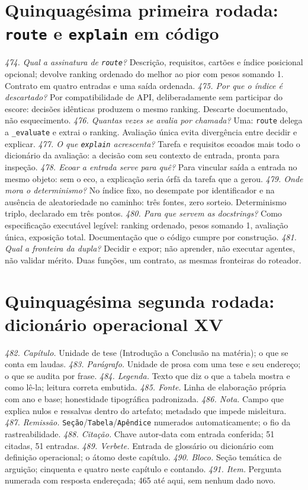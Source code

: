 \section{Quinquagésima primeira rodada: \texttt{route} e \texttt{explain} em código}
\textit{474. Qual a assinatura de \texttt{route}?} Descrição, requisitos, cartões e índice posicional opcional; devolve ranking ordenado do melhor ao pior com pesos somando 1. Contrato em quatro entradas e uma saída ordenada.
\textit{475. Por que o índice é descartado?} Por compatibilidade de API, deliberadamente sem participar do escore: decisões idênticas produzem o mesmo ranking. Descarte documentado, não esquecimento.
\textit{476. Quantas vezes se avalia por chamada?} Uma: \texttt{route} delega a \texttt{\_evaluate} e extrai o ranking. Avaliação única evita divergência entre decidir e explicar.
\textit{477. O que \texttt{explain} acrescenta?} Tarefa e requisitos ecoados mais todo o dicionário da avaliação: a decisão com seu contexto de entrada, pronta para inspeção.
\textit{478. Ecoar a entrada serve para quê?} Para vincular saída a entrada no mesmo objeto: sem o eco, a explicação seria órfã da tarefa que a gerou.
\textit{479. Onde mora o determinismo?} No índice fixo, no desempate por identificador e na ausência de aleatoriedade no caminho: três fontes, zero sorteio. Determinismo triplo, declarado em três pontos.
\textit{480. Para que servem as docstrings?} Como especificação executável legível: ranking ordenado, pesos somando 1, avaliação única, exposição total. Documentação que o código cumpre por construção.
\textit{481. Qual a fronteira da dupla?} Decidir e expor; não aprender, não executar agentes, não validar mérito. Duas funções, um contrato, as mesmas fronteiras do roteador.
\section{Quinquagésima segunda rodada: dicionário operacional XV}
\textit{482. Capítulo.} Unidade de tese (Introdução a Conclusão na matéria); o que se conta em laudas.
\textit{483. Parágrafo.} Unidade de prosa com uma tese e seu endereço; o que se audita por frase.
\textit{484. Legenda.} Texto que diz o que a tabela mostra e como lê-la; leitura correta embutida.
\textit{485. Fonte.} Linha de elaboração própria com ano e base; honestidade tipográfica padronizada.
\textit{486. Nota.} Campo que explica nulos e ressalvas dentro do artefato; metadado que impede misleitura.
\textit{487. Remissão.} \texttt{Seção}/\texttt{Tabela}/\texttt{Apêndice} numerados automaticamente; o fio da rastreabilidade.
\textit{488. Citação.} Chave autor-data com entrada conferida; 51 citadas, 51 entradas.
\textit{489. Verbete.} Entrada de glossário ou dicionário com definição operacional; o átomo deste capítulo.
\textit{490. Bloco.} Seção temática de arguição; cinquenta e quatro neste capítulo e contando.
\textit{491. Item.} Pergunta numerada com resposta endereçada; 465 até aqui, sem nenhum dado novo.
